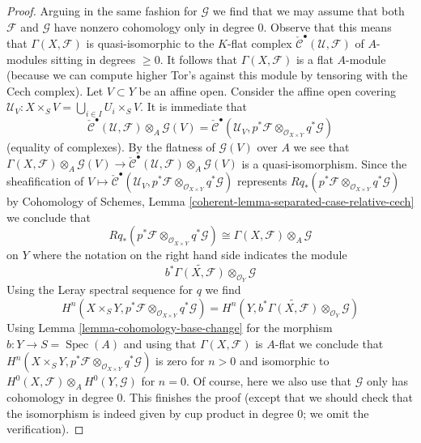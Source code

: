 \documentclass{stacks-project}
\theoremstyle{plain}
\theoremstyle{definition}
\theoremstyle{remark}
\numberwithin{equation}{subsection}
\def\Spec{\mathop{\mathrm{Spec}}}
\begin{document}
\begin{proof}
\medskip\noindent
Arguing in the same fashion for $\mathcal{G}$ we find that we
may assume that both $\mathcal{F}$ and $\mathcal{G}$
have nonzero cohomology only in degree $0$.
Observe that this means that $\Gamma(X, \mathcal{F})$
is quasi-isomorphic to the $K$-flat complex
$\check{\mathcal{C}}^\bullet(\mathcal{U}, \mathcal{F})$
of $A$-modules sitting in degrees $\geq 0$.
It follows that $\Gamma(X, \mathcal{F})$ is a flat $A$-module
(because we can compute higher Tor's against this module
by tensoring with the Cech complex).
Let $V \subset Y$ be an affine open. Consider the affine open covering
$\mathcal{U}_V : X \times_S V = \bigcup_{i \in I} U_i \times_S V$.
It is immediate that
$$
\check{\mathcal{C}}^\bullet(\mathcal{U}, \mathcal{F})
\otimes_A \mathcal{G}(V) =
\check{\mathcal{C}}^\bullet(\mathcal{U}_V,
p^*\mathcal{F} \otimes_{\mathcal{O}_{X \times Y}}
q^*\mathcal{G})
$$
(equality of complexes). By the flatness of $\mathcal{G}(V)$
over $A$ we see that
$\Gamma(X, \mathcal{F}) \otimes_A \mathcal{G}(V) \to
\check{\mathcal{C}}^\bullet(\mathcal{U}, \mathcal{F})
\otimes_A \mathcal{G}(V)$ is a quasi-isomorphism.
Since the sheafification of
$V \mapsto \check{\mathcal{C}}^\bullet(\mathcal{U}_V,
p^*\mathcal{F} \otimes_{\mathcal{O}_{X \times Y}}
q^*\mathcal{G})$ represents
$Rq_*(p^*\mathcal{F} \otimes_{\mathcal{O}_{X \times Y}} q^*\mathcal{G})$
by Cohomology of Schemes, Lemma
\ref{coherent-lemma-separated-case-relative-cech}
we conclude that
$$
Rq_*(p^*\mathcal{F} \otimes_{\mathcal{O}_{X \times Y}} q^*\mathcal{G})
\cong
\Gamma(X, \mathcal{F}) \otimes_A \mathcal{G}
$$
on $Y$ where the notation on the right hand side indicates the module
$$
b^*\widetilde{\Gamma(X, \mathcal{F})} \otimes_{\mathcal{O}_Y} \mathcal{G}
$$
Using the Leray spectral sequence for $q$ we find
$$
H^n(X \times_S Y, p^*\mathcal{F} \otimes_{\mathcal{O}_{X \times Y}}
q^*\mathcal{G}) =
H^n(Y,
b^*\widetilde{\Gamma(X, \mathcal{F})} \otimes_{\mathcal{O}_Y} \mathcal{G})
$$
Using Lemma \ref{lemma-cohomology-base-change} for the morphism
$b : Y \to S = \Spec(A)$ and using that $\Gamma(X, \mathcal{F})$
is $A$-flat we conclude that
$H^n(X \times_S Y, p^*\mathcal{F} \otimes_{\mathcal{O}_{X \times Y}}
q^*\mathcal{G})$ is zero for $n > 0$ and isomorphic to
$H^0(X, \mathcal{F}) \otimes_A H^0(Y, \mathcal{G})$ for $n = 0$.
Of course, here we also use that $\mathcal{G}$ only has
cohomology in degree $0$.
This finishes the proof (except that we should check that the
isomorphism is indeed given by cup product in degree $0$; we omit
the verification).
\end{proof}
\end{document}
